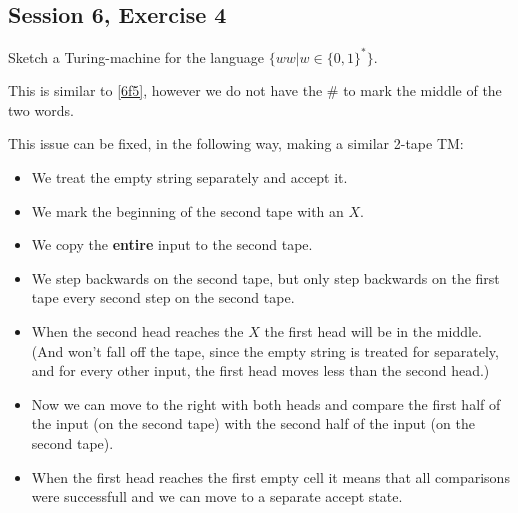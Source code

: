 \subsection {Session 6, Exercise 4}


Sketch a Turing-machine for the language $\{ww | w \in \{0,1\}^*\}$.


This is similar to \ref{6f5}, however we do not have the $\#$ to mark the middle of the two words.

This issue can be fixed, in the following way, making a similar 2-tape TM:

\begin{itemize}
    \item We treat the empty string separately and accept it.
    \item We mark the beginning of the second tape with an $X$.
    \item We copy the \textbf{entire} input to the second tape.
    \item We step backwards on the second tape, but only step backwards on the first tape every second step on the second tape.
    \item When the second head reaches the $X$ the first head will be in the middle. (And won't fall off the tape, since the empty string is treated for separately, and for every other input, the first head moves less than the second head.)
    \item Now we can move to the right with both heads and compare the first half of the input (on the second tape) with the second half of the input (on the second tape).
    \item When the first head reaches the first empty cell it means that all comparisons were successfull and we can move to a separate accept state.
\end{itemize}